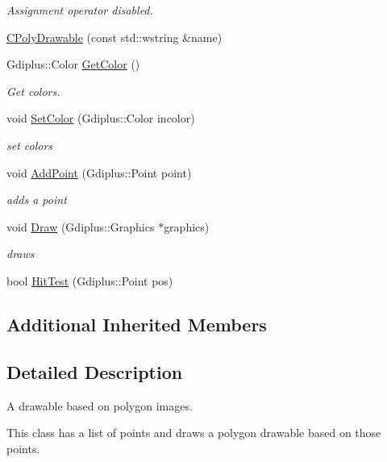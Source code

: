 \begin{DoxyCompactItemize}
\begin{DoxyCompactList}\small\item\em Assignment operator disabled. \end{DoxyCompactList}\item 
\hyperlink{class_c_poly_drawable_a0afc2421a1a15fa7065423ccbe6d6ecc}{C\+Poly\+Drawable} (const std\+::wstring \&name)
\item 
Gdiplus\+::\+Color \hyperlink{class_c_poly_drawable_ab14b6cfd0e8c3ae025daa43465a1811f}{Get\+Color} ()
\begin{DoxyCompactList}\small\item\em Get colors. \end{DoxyCompactList}\item 
void \hyperlink{class_c_poly_drawable_a9f53b3d0a6ee9aa6f34a0c44a5a2cd66}{Set\+Color} (Gdiplus\+::\+Color incolor)
\begin{DoxyCompactList}\small\item\em set colors \end{DoxyCompactList}\item 
void \hyperlink{class_c_poly_drawable_a500a475002f4be3cfe6ed865aea0a827}{Add\+Point} (Gdiplus\+::\+Point point)
\begin{DoxyCompactList}\small\item\em adds a point \end{DoxyCompactList}\item 
void \hyperlink{class_c_poly_drawable_a30d59469ee2db1cd0bf786ffff031bdf}{Draw} (Gdiplus\+::\+Graphics $\ast$graphics)
\begin{DoxyCompactList}\small\item\em draws \end{DoxyCompactList}\item 
bool \hyperlink{class_c_poly_drawable_af45e78d42d9eee657e0bedde0fe003e4}{Hit\+Test} (Gdiplus\+::\+Point pos)
\end{DoxyCompactItemize}
\subsection*{Additional Inherited Members}


\subsection{Detailed Description}
A drawable based on polygon images.

This class has a list of points and draws a polygon drawable based on those points. 

